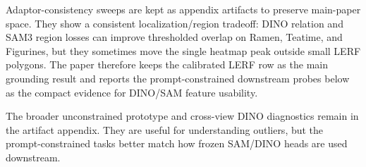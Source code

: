 \documentclass[10pt,twocolumn,letterpaper]{article}
\begin{document}
Adaptor-consistency sweeps are kept as appendix artifacts to preserve main-paper
space. They show a consistent localization/region tradeoff: DINO relation and
SAM3 region losses can improve thresholded overlap on Ramen, Teatime, and
Figurines, but they sometimes move the single heatmap peak outside small LERF
polygons. The paper therefore keeps the calibrated LERF row as the main
grounding result and reports the prompt-constrained downstream probes below as
the compact evidence for DINO/SAM feature usability.

The broader unconstrained prototype and cross-view DINO diagnostics remain in
the artifact appendix. They are useful for understanding outliers, but the
prompt-constrained tasks better match how frozen SAM/DINO heads are used
downstream.

\begin{table}[t]
\centering
\caption{Promptable SAM3-adaptor and dense DINOv3-adaptor tasks on LERF-OVS.
These probes use the same annotations as the grounding benchmark but replace
text queries with adaptor-space prompts or source-target correspondences. SAM3
point/box prompts are prompt-constrained, mask propagation uses source-view
support only, and no external SAM3 mask decoder is called. DINO mask
propagation uses source-background contrast 1.10 plus GT-free multi-head
readout: top-$k$ foreground pooling, 2.0$\times$ propagated-area scaling,
peak-component cleanup, and SAM-adaptor boundary refinement.}
\label{tab:sam_dino_tasks}
\end{table}
\end{document}
